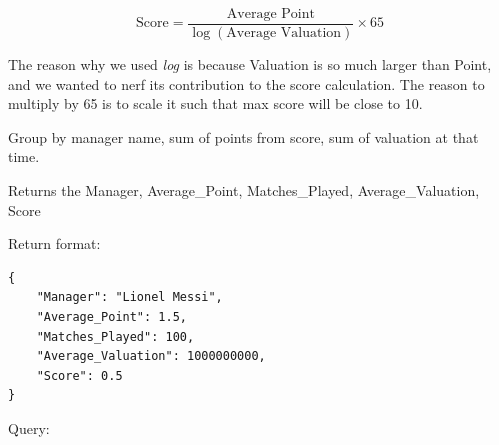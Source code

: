 \documentclass{Configuration_Files/PoliMi3i_thesis}
\begin{document}
\[
\text{Score} = \frac{\text{Average Point}}{\log(\text{Average Valuation})} \times 65
\]

The reason why we used \textit{log} is because Valuation is so much larger than Point, and we wanted to nerf its contribution to the score calculation. The reason to multiply by 65 is to scale it such that max score will be close to 10.

Group by manager name, sum of points from score, sum of valuation at that time.

Returns the Manager, Average\_Point, Matches\_Played, Average\_Valuation, Score

Return format:
\begin{lstlisting}[style=json]
{
    "Manager": "Lionel Messi",
    "Average_Point": 1.5,
    "Matches_Played": 100,
    "Average_Valuation": 1000000000,
    "Score": 0.5
}
\end{lstlisting}


Query:
\end{document}
